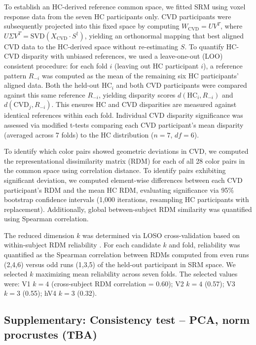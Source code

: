 To establish an HC-derived reference common space, we fitted SRM using voxel response data from the seven HC participants only. CVD participants were subsequently projected into this fixed space by computing $W_{\text{CVD}} = U V^T$, where $U \Sigma V^T = \text{SVD}(X_{\text{CVD}} \cdot S^\dagger)$, yielding an orthonormal mapping that best aligned CVD data to the HC-derived space without re-estimating $S$. To quantify HC-CVD disparity with unbiased references, we used a leave-one-out (LOO) consistent procedure: for each fold $i$ (leaving out HC participant $i$), a reference pattern $R_{-i}$ was computed as the mean of the remaining six HC participants' aligned data. Both the held-out $\text{HC}_i$ and both CVD participants were compared against this same reference $R_{-i}$, yielding disparity scores $d(\text{HC}_i, R_{-i})$ and $d(\text{CVD}_j, R_{-i})$. This ensures HC and CVD disparities are measured against identical references within each fold. Individual CVD disparity significance was assessed via  modified t-tests comparing each CVD participant's mean disparity (averaged across 7 folds) to the HC distribution ($n=7$, $df=6$).

To identify which color pairs showed geometric deviations in CVD, we computed the representational dissimilarity matrix (RDM) for each of all 28 color pairs in the common space using correlation distance. To identify pairs exhibiting significant deviation, we computed element-wise differences between each CVD participant's RDM and the mean HC RDM, evaluating significance via 95\% bootstrap confidence intervals (1,000 iterations, resampling HC participants with replacement). Additionally, global between-subject RDM similarity was quantified using Spearman correlation.

The reduced dimension $k$ was determined via LOSO cross-validation based on within-subject RDM reliability \cite{cunningham2014}. For each candidate $k$ and fold, reliability was quantified as the Spearman correlation between RDMs computed from even runs (2,4,6) versus odd runs (1,3,5) of the held-out participant in SRM space. We selected $k$ maximizing mean reliability across seven folds. The selected values were: V1 $k = 4$ (cross-subject RDM correlation = 0.60); V2 $k = 4$ (0.57); V3 $k = 3$ (0.55); hV4 $k = 3$ (0.32).

\subsection*{Supplementary: Consistency test -- PCA, norm procrustes (TBA)}

